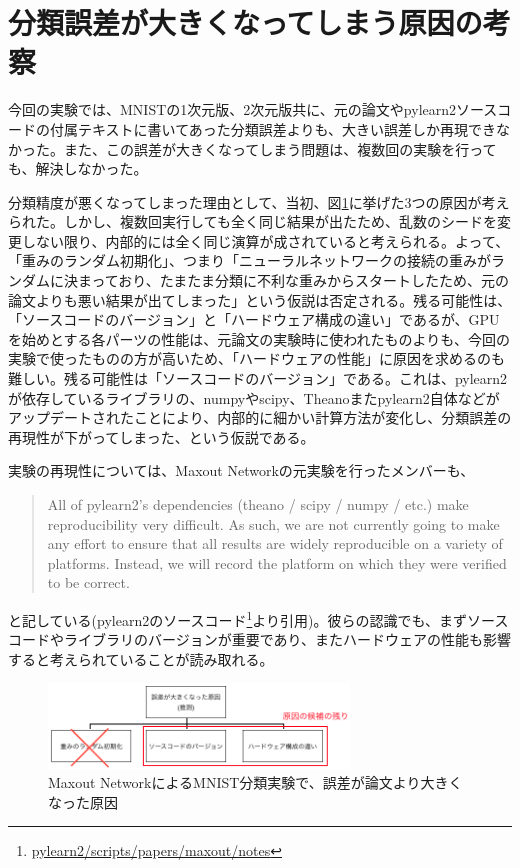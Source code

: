\section{分類誤差が大きくなってしまう原因の考察}
今回の実験では、MNISTの1次元版、2次元版共に、元の論文やpylearn2ソースコードの付属テキストに書いてあった分類誤差よりも、大きい誤差しか再現できなかった。また、この誤差が大きくなってしまう問題は、複数回の実験を行っても、解決しなかった。\par
分類精度が悪くなってしまった理由として、当初、図\ref{c6_maxout_cause}に挙げた3つの原因が考えられた。しかし、複数回実行しても全く同じ結果が出たため、乱数のシードを変更しない限り、内部的には全く同じ演算が成されていると考えられる。よって、「重みのランダム初期化」、つまり「ニューラルネットワークの接続の重みがランダムに決まっており、たまたま分類に不利な重みからスタートしたため、元の論文よりも悪い結果が出てしまった」という仮説は否定される。残る可能性は、「ソースコードのバージョン」と「ハードウェア構成の違い」であるが、GPUを始めとする各パーツの性能は、元論文の実験時に使われたものよりも、今回の実験で使ったものの方が高いため、「ハードウェアの性能」に原因を求めるのも難しい。残る可能性は「ソースコードのバージョン」である。これは、pylearn2が依存しているライブラリの、numpyやscipy、Theanoまたpylearn2自体などがアップデートされたことにより、内部的に細かい計算方法が変化し、分類誤差の再現性が下がってしまった、という仮説である。\par
実験の再現性については、Maxout Networkの元実験を行ったメンバーも、
\begin{quote}
All of pylearn2's dependencies (theano / scipy / numpy / etc.) make reproducibility
very difficult. As such, we are not currently going to make any effort to ensure that
all results are widely reproducible on a variety of platforms. Instead, we will
record the platform on which they were verified to be correct.
\end{quote}
と記している(pylearn2のソースコード\footnote{\url{pylearn2/scripts/papers/maxout/notes}}より引用)。彼らの認識でも、まずソースコードやライブラリのバージョンが重要であり、またハードウェアの性能も影響すると考えられていることが読み取れる。\\
\begin{figure}[tbp]
 \begin{center}
  \includegraphics[width=80mm]{img/c6/maxout_error_cause}
 \end{center}
 \caption{Maxout NetworkによるMNIST分類実験で、誤差が論文より大きくなった原因}
 \label{c6_maxout_cause}
\end{figure}
